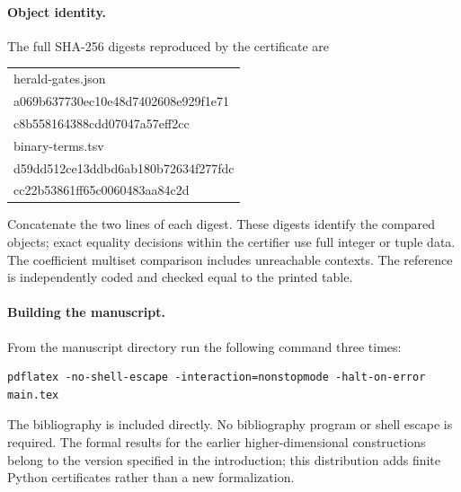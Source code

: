 \paragraph{Object identity.}
The full SHA-256 digests reproduced by the certificate are
\begin{center}
\small\ttfamily
\begin{tabular}{@{}l@{}}
herald-gates.json\\
a069b637730ec10e48d7402608e929f1e71\\
c8b558164388cdd07047a57eff2cc\\[3pt]
binary-terms.tsv\\
d59dd512ce13ddbd6ab180b72634f277fdc\\
cc22b53861ff65c0060483aa84c2d
\end{tabular}
\end{center}
Concatenate the two lines of each digest. These digests identify the compared objects; exact equality decisions within the certifier use full integer or tuple data. The coefficient multiset comparison includes unreachable contexts. The reference is independently coded and checked equal to the printed table.

\paragraph{Building the manuscript.}
From the manuscript directory run the following command three times:
\begin{verbatim}
pdflatex -no-shell-escape -interaction=nonstopmode -halt-on-error main.tex
\end{verbatim}
The bibliography is included directly. No bibliography program or shell escape is required. The formal results for the earlier higher-dimensional constructions belong to the version specified in the introduction; this distribution adds finite Python certificates rather than a new formalization.
